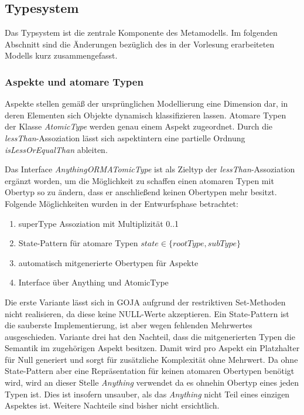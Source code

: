 \subsection{Typesystem}
Das Typsystem ist die zentrale Komponente des Metamodells. Im folgenden Abschnitt sind die 
Änderungen bezüglich des in der Vorlesung erarbeiteten Modells kurz zusammengefasst.

\subsubsection{Aspekte und atomare Typen}

Aspekte stellen gemäß der ursprünglichen Modellierung eine Dimension dar, in deren Elementen sich Objekte dynamisch klassifizieren lassen. 
Atomare Typen der Klasse \emph{AtomicType} werden genau einem Aspekt zugeordnet. Durch die \emph{lessThan}-Assoziation lässt sich aspektintern eine 
partielle Ordnung \emph{isLessOrEqualThan} ableiten.  


Das Interface \emph{AnythingORMATomicType} ist als Zieltyp der \emph{lessThan}-Assoziation ergänzt worden, 
um die Möglichkeit zu schaffen einen atomaren Typen mit Obertyp so zu ändern, dass er anschließend keinen 
Obertypen mehr besitzt. Folgende Möglichkeiten wurden in der Entwurfsphase betrachtet: 
\begin{enumerate}
  		\item superType Assoziation mit Multiplizität 0..1
		\item State-Pattern für atomare Typen \(state \in \{rootType, subType\}\)
        \item automatisch mitgenerierte Obertypen für Aspekte
        \item Interface über Anything und AtomicType
\end{enumerate}

Die erste Variante lässt sich in GOJA aufgrund der restriktiven Set-Methoden nicht realisieren, da diese keine NULL-Werte akzeptieren.
Ein State-Pattern ist die sauberste Implementierung, ist aber wegen fehlenden Mehrwertes ausgeschieden. 
Variante drei hat den Nachteil, dass die mitgenerierten Typen die Semantik  im zugehörigen Aspekt besitzen.
Damit wird pro Aspekt ein Platzhalter für Null generiert und sorgt für zusätzliche Komplexität ohne Mehrwert. 
Da ohne State-Pattern aber eine Repräsentation für keinen atomaren Obertypen benötigt wird, wird an dieser Stelle \emph{Anything} verwendet 
da es ohnehin Obertyp eines jeden Typen ist. Dies ist insofern unsauber, als das \emph{Anything} nicht Teil eines einzigen Aspektes ist.
Weitere Nachteile sind bisher nicht ersichtlich.


